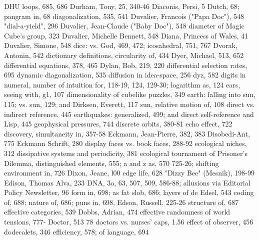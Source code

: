 DHU loops, 685, 686                                  Durham, Tony, 25, 340-46
Diaconis, Persi, 5                                   Dutch, 68; pangram in, 68
diagonalization, 535, 541                            Duvalier, Francois ("Papa Doc"), 548
"dial-a-yield", 296                                  Duvalier, Jean-Claude ("Baby Doc"), 548
diameter of Magic Cube's group, 323                  Duvalier, Michelle Bennett, 548
Diana, Princess of Wales, 41                         Duvalier, Simone, 548
dice: vs. God, 469, 472; icosahedral, 751, 767       Dvorak, Antonin, 542
dictionary definitions, circularity of, 434          Dyer, Michael, 513, 652
differential equations, 378, 465                     Dylan, Bob, 219, 220
differential selection rates, 695                    dynamic diagonalization, 535
diffusion in idea-space, 256                         dyz, 582
digits in numeral, number of intuition for,
 118-19, 124, 129-30; logarithm as, 124              ears, seeing with, g1, 107
dimensionality of cubelike puzzles, 349              earth: falling into sun, 115; vs. sun, 129; and
Dirksen, Everett, 117                                 sun, relative motion of, 108
direct vs. indirect reference, 445                   earthquakes: generalized, 499; and
direct self-reference and Lisp, 445                   geophysical pressures, 744
discrete orbits, 380-81                              echo effect, 722
discovery, simultaneity in, 357-58                   Eckmann, Jean-Pierre, 382, 383
Disobedi-Ant, 775                                    Eckmann Schrift, 280
display faces vs. book faces, 288-92                 ecological niches, 312
dissipative systems and periodicity, 381             ecological tournament of Prisoner's Dilemma,
distinguished elements, 555; a and z as, 570          725-26; shifting environment in, 726
Dixon, Jeane, l00                                    edge life, 628
"Dizzy Bee" (Mesnik), 198-99                         Edison, Thomas Alva, 233
DNA, 3o, 63, 507, 509, 586-88; allusions via         Editorial Policy Newsletter, 96
 form in, 698; as fat slob, 686; layers of de        Edsel, 543
 coding of, 688; nature of, 686; puns in, 698,       Edson, Russell, 225-26
 structure of, 687                                   effective categories, 539
Dobbs, Adrian, 474                                   effective randomness of world tensions, 777-
Doctor, 513                                           78
doctors vs. nurses' caps, 1.56                       effect of observer, 456
dodecalets, 346                                      efficiency, 578; of language, 694
